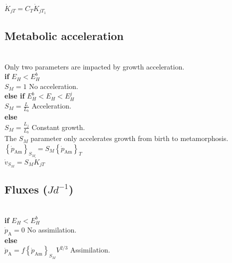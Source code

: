 $\dot{K}_{jT} = C_{T} \dot{K}_{jT_{1}}$\\

\subsection*{Metabolic acceleration}
\hfill \\

Only two parameters are impacted by growth acceleration.\\

\textbf{if}	$E_{H} < E_{H}^b$\\

$S_{M} = 1$ \hfill No acceleration.\\

\textbf{else if} $E_{H}^b < E_{H} < E_{H}^j$\\

$S_{M} = \frac{L}{L_{b}}$ \hfill Acceleration.\\

\textbf{else}\\

$S_{M} = \frac{L_{j}}{L_{b}}$ \hfill Constant growth.\\

The $S_{M}$ parameter only accelerates growth from birth to metamorphosis.\\

$\left \{ \dot{p}_\mathrm{Am} \right \}_{S_{M}} = S_{M} \left \{ \dot{p}_\mathrm{Am} \right \}_{T}$\\

$\dot{v}_{S_{M}} = S_{M} \dot{K}_{jT}$\\

\subsection*{Fluxes ($Jd^{-1}$)}
\hfill \\

\textbf{if}	$E_{H} < E_{H}^b$\\

$\dot{p}_\mathrm{A} = 0$ \hfill No assimilation.\\

\textbf{else}\\

$\dot{p}_\mathrm{A} = f \left \{ \dot{p}_\mathrm{Am} \right \}_{S_{M}} V^{2/3}$ \hfill Assimilation.\\

\hfill \\

